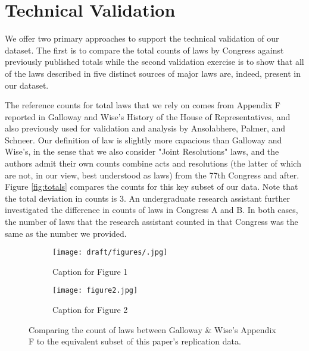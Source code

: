 \documentclass[fleqn,10pt]{wlscirep}
\begin{document}

\section*{Technical Validation}


We offer two primary approaches to support the technical validation of our dataset. The first is to compare the total counts of laws by Congress against previously published totals while the second validation exercise is to show that all of the laws described in five distinct sources of major laws are, indeed, present in our dataset.

The reference counts for total laws that we rely on comes from Appendix F reported in Galloway and Wise's History of the House of Representatives\nocite{gallowaywise}, and also previously used for validation and analysis by Ansolabhere, Palmer, and Schneer.\cite{ansolabehere_palmer_schneer_2016} Our definition of law is slightly more capacious than Galloway and Wise's, in the sense that we also consider "Joint Resolutions" laws, and the authors admit their own counts combine acts and resolutions (the latter of which are not, in our view, best understood as laws) from the 77th Congress and after. Figure \ref{fig:totals} compares the counts for this key subset of our data. Note that the total deviation in counts is 3. An undergraduate research assistant further investigated the difference in counts of laws in Congress A and B. In both cases, the number of laws that the research assistant counted in that Congress was the same as the number we provided. 

\begin{figure}[htbp]
  \centering
  \begin{subfigure}{0.4\textwidth}
    \centering
    \texttt{[image: draft/figures/.jpg]}
    \caption{Caption for Figure 1}
    \label{fig:subfig1}
  \end{subfigure}
  \hfill
  \begin{subfigure}{0.4\textwidth}
    \centering
    \texttt{[image: figure2.jpg]}
    \caption{Caption for Figure 2}
    \label{fig:subfig2}
  \end{subfigure}
  \caption{Comparing the count of laws between Galloway \& Wise's Appendix F to the equivalent subset of this paper's replication data.}
  \label{fig:main}
\end{figure}
\end{document}

